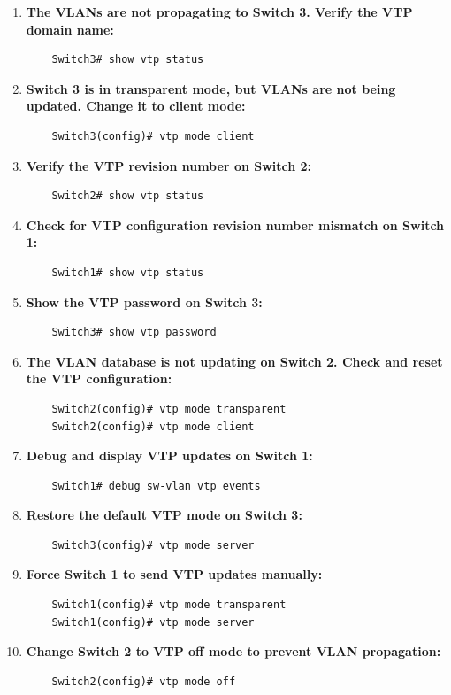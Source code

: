 \documentclass[a4paper]{book}
\begin{document}
\begin{enumerate}
    \item \textbf{The VLANs are not propagating to Switch 3. Verify the VTP domain name:}
    \begin{lstlisting}
    Switch3# show vtp status
    \end{lstlisting}

    \item \textbf{Switch 3 is in transparent mode, but VLANs are not being updated. Change it to client mode:}
    \begin{lstlisting}
    Switch3(config)# vtp mode client
    \end{lstlisting}

    \item \textbf{Verify the VTP revision number on Switch 2:}
    \begin{lstlisting}
    Switch2# show vtp status
    \end{lstlisting}

    \item \textbf{Check for VTP configuration revision number mismatch on Switch 1:}
    \begin{lstlisting}
    Switch1# show vtp status
    \end{lstlisting}

    \item \textbf{Show the VTP password on Switch 3:}
    \begin{lstlisting}
    Switch3# show vtp password
    \end{lstlisting}

    \item \textbf{The VLAN database is not updating on Switch 2. Check and reset the VTP configuration:}
    \begin{lstlisting}
    Switch2(config)# vtp mode transparent
    Switch2(config)# vtp mode client
    \end{lstlisting}

    \item \textbf{Debug and display VTP updates on Switch 1:}
    \begin{lstlisting}
    Switch1# debug sw-vlan vtp events
    \end{lstlisting}

    \item \textbf{Restore the default VTP mode on Switch 3:}
    \begin{lstlisting}
    Switch3(config)# vtp mode server
    \end{lstlisting}

    \item \textbf{Force Switch 1 to send VTP updates manually:}
    \begin{lstlisting}
    Switch1(config)# vtp mode transparent
    Switch1(config)# vtp mode server
    \end{lstlisting}

    \item \textbf{Change Switch 2 to VTP off mode to prevent VLAN propagation:}
    \begin{lstlisting}
    Switch2(config)# vtp mode off
    \end{lstlisting}
\end{enumerate}
\end{document}
